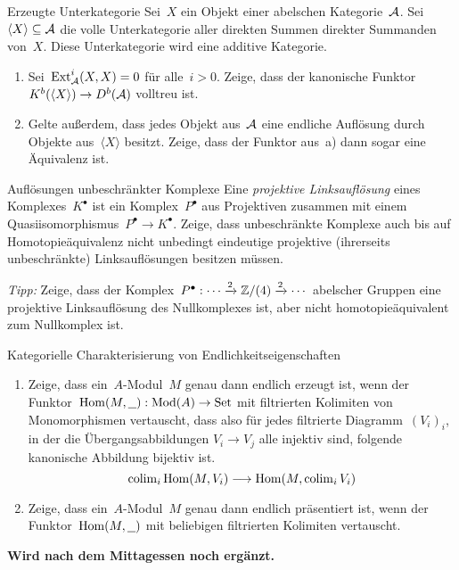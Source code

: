 \documentclass{uebblatt}
\begin{document}

\begin{aufgabe}{Erzeugte Unterkategorie}
Sei~$X$ ein Objekt einer abelschen Kategorie~$\mathcal{A}$. Sei~$\langle X \rangle
\subseteq \mathcal{A}$ die volle Unterkategorie aller direkten Summen direkter Summanden
von~$X$. Diese Unterkategorie wird eine additive Kategorie.
\begin{enumerate}
\item Sei~$\mathrm{Ext}_{\mathcal{A}}^i(X,X) = 0$ für alle~$i > 0$. Zeige, dass der kanonische
Funktor~$K^b(\langle X \rangle) \to D^b(\mathcal{A})$ volltreu ist.
\item Gelte außerdem, dass jedes Objekt aus~$\mathcal{A}$ eine endliche Auflösung durch Objekte
aus~$\langle X \rangle$ besitzt. Zeige, dass der Funktor aus~a) dann sogar eine
Äquivalenz ist.
\end{enumerate}
\end{aufgabe}

\begin{aufgabe}{Auflösungen unbeschränkter Komplexe}
Eine \emph{projektive Linksauflösung} eines Komplexes~$K^\bullet$ ist ein
Komplex~$P^\bullet$ aus Projektiven zusammen mit einem
Quasiisomorphismus~$P^\bullet \to K^\bullet$. Zeige, dass unbeschränkte
Komplexe auch bis auf Homotopieäquivalenz nicht unbedingt eindeutige projektive
(ihrerseits unbeschränkte) Linksauflösungen besitzen müssen.

{\tiny\emph{Tipp:} Zeige, dass der Komplex~$P^\bullet : \cdots \xrightarrow{2} \mathbb{Z}/(4)
\xrightarrow{2} \cdots$ abelscher Gruppen eine projektive Linksauflösung des
Nullkomplexes ist, aber nicht homotopieäquivalent zum Nullkomplex ist.\par}
\end{aufgabe}

\begin{aufgabe}{Kategorielle Charakterisierung von Endlichkeitseigenschaften}
\begin{enumerate}
\item Zeige, dass ein~$A$-Modul~$M$ genau dann endlich erzeugt ist, wenn der
Funktor~$\mathrm{Hom}(M,\underline{\ \ }) : \mathrm{Mod}(A) \to \mathrm{Set}$ mit filtrierten
Kolimiten von Monomorphismen vertauscht, dass also für jedes filtrierte
Diagramm~$(V_i)_i$, in der die Übergangsabbildungen $V_i \to V_j$ alle injektiv
sind, folgende kanonische Abbildung bijektiv ist.
\[ \operatorname{colim}_i \mathrm{Hom}(M,V_i) \longrightarrow \mathrm{Hom}(M, \operatorname{colim}_i V_i) \]
\item Zeige, dass ein~$A$-Modul~$M$ genau dann endlich präsentiert ist, wenn
der Funktor~$\mathrm{Hom}(M,\underline{\ \ })$ mit beliebigen filtrierten Kolimiten
vertauscht.
\end{enumerate}
\end{aufgabe}

\begin{center}\textbf{Wird nach dem Mittagessen noch ergänzt.}\end{center}
\end{document}
